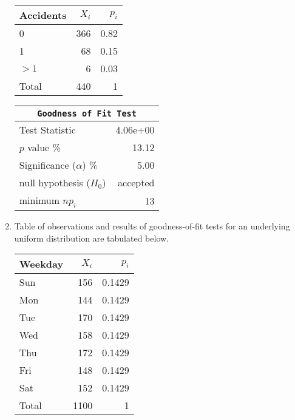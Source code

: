\begin{enumerate}
	\begin{table}[H]
		\centering
		\begin{minipage}{0.4\textwidth}
			\centering
			\begin{tabular}{@{}lrr@{}}
				\toprule
				Accidents & $X_i$ & $p_i$ \\
				\midrule
				0     &   366 &  0.82 \\
				1     &    68 &  0.15 \\
				$>1$  &     6 &  0.03 \\
				\midrule
				Total &   440 &     1 \\
				\bottomrule
			\end{tabular}
			
		\end{minipage}
		\begin{minipage}{0.4\textwidth}
			\centering
			\begin{tabular}{@{}lr@{}}
				\toprule
				\multicolumn{2}{c}{\texttt{Goodness of Fit Test}} \\
				\midrule
				Test Statistic             &  4.06e+00 \\
				$p$ value \%               &     13.12 \\
				Significance ($\alpha$) \% &      5.00 \\
				null hypothesis ($H_0$)    &  accepted \\
				minimum $n p_i$            &        13 \\
				\bottomrule
			\end{tabular}
			
		\end{minipage}
	\end{table}
	\bigskip
	
	\item Table of observations and results of goodness-of-fit tests for an underlying uniform distribution are tabulated below.
	
	\begin{table}[H]
		\centering
		\begin{minipage}{0.4\textwidth}
			\centering
			\begin{tabular}{@{}lrr@{}}
				\toprule
				Weekday & $X_i$ &   $p_i$ \\
				\midrule
				Sun   &   156 &  0.1429 \\
				Mon   &   144 &  0.1429 \\
				Tue   &   170 &  0.1429 \\
				Wed   &   158 &  0.1429 \\
				Thu   &   172 &  0.1429 \\
				Fri   &   148 &  0.1429 \\
				Sat   &   152 &  0.1429 \\
				\midrule
				Total &  1100 &       1 \\
				\bottomrule
			\end{tabular}
			

\end{minipage}
\end{table}
\end{enumerate}
